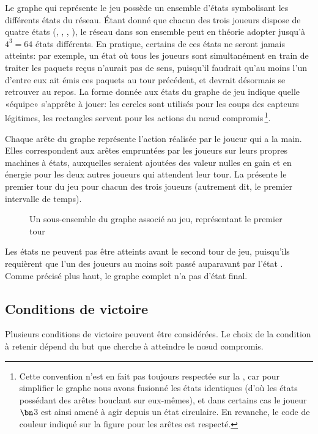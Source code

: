 Le graphe qui représente le jeu possède un ensemble d'états symbolisant les différents états du réseau.
Étant donné que chacun des trois joueurs dispose de quatre états (\idle, \send, \listen, \treatmsg), le réseau dans son ensemble peut en théorie adopter jusqu'à $4^3=64$ états différents.
En pratique, certains de ces états ne seront jamais atteints: par exemple, un état où tous les joueurs sont simultanément en train de traiter les paquets reçus n'aurait pas de sens, puisqu'il faudrait qu'au moins l'un d'entre eux ait émis ces paquets au tour précédent, et devrait désormais se retrouver au repos.
La forme donnée aux états du graphe de jeu indique quelle «équipe» s'apprête à jouer: les cercles sont utilisés pour les coups des capteurs légitimes, les rectangles servent pour les actions du nœud compromis\,\footnote{Cette convention n'est en fait pas toujours respectée sur la , car pour simplifier le graphe nous avons fusionné les états identiques (d'où les états possédant des arêtes bouclant sur eux-mêmes), et dans certains cas le joueur $\bn$3 est ainsi amené à agir depuis un état circulaire. En revanche, le code de couleur indiqué sur la figure pour les arêtes est respecté.}.

Chaque arête du graphe représente l'action réalisée par le joueur qui a la main.
Elles correspondent aux arêtes empruntées par les joueurs sur leurs propres machines à états, auxquelles seraient ajoutées des valeur nulles en gain et en énergie pour les deux autres joueurs qui attendent leur tour.
La  présente le premier tour du jeu pour chacun des trois joueurs (autrement dit, le premier intervalle de temps).
\begin{figure}[p]
    \centering
    
    \caption{Un sous-ensemble du graphe associé au jeu, représentant le premier tour}\label{tj:fig:autFirstTurn}
\end{figure}
Les états \treatmsg ne peuvent pas être atteints avant le second tour de jeu, puisqu'ils requièrent que l'un des joueurs au moins soit passé auparavant par l'état \listen.
Comme précisé plus haut, le graphe complet n'a pas d'état final.

    \subsection{Conditions de victoire}

Plusieurs conditions de victoire peuvent être considérées.
Le choix de la condition à retenir dépend du but que cherche à atteindre le nœud compromis.

